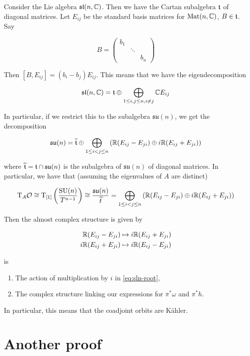 \documentclass{article}
\DeclareMathOperator{\SU}{SU}
\newcommand{\su}{\mathfrak{su}}
\renewcommand{\sl}{\mathfrak{sl}}
\renewcommand{\tilde}{\widetilde}
\begin{document}
Consider the Lie algebra \(\sl(n, \C)\). Then we have the Cartan subalgebra \(\mathfrak{t}\) of diagonal matrices. Let \(E_{ij}\) be the standard basis matrices for \(\operatorname{Mat}(n, \mathbb{C})\), \(B \in \mathfrak{t}\). Say

\[B = \begin{pmatrix}
    b_1 \\
    & \ddots \\
    & & b_n
\end{pmatrix}\]

Then \([B, E_{ij}] = (b_i - b_j)E_{ij}\). This means that we have the eigendecomposition

\begin{equation}
    \label{eq:sln-root}
    \sl(n, \C) = \mft \oplus \bigoplus_{1 \le i, j \le n, i \ne j} \C E_{ij}
\end{equation}

In particular, if we restrict this to the subalgebra \(\su(n)\), we get the decomposition

\[\su(n) = \tilde\mft \oplus \bigoplus_{1 \le i < j \le n} \left(\R(E_{ij} - E_{ji}) \oplus i\R (E_{ij} + E_{ji})\right)\]

where \(\tilde \mft = \mft \cap \su(n)\) is the subalgebra of \(\su(n)\) of diagonal matrices. In particular, we have that (assuming the eigenvalues of \(A\) are distinct)

\[\T_A\mcO \cong \T_{[1]}\left(\frac{\SU(n)}{T^{n-1}}\right) \cong \frac{\su(n)}{\tilde t} = \bigoplus_{1 \le i < j \le n} \left(\R(E_{ij} - E_{ji}) \oplus i\R (E_{ij} + E_{ji})\right)\]

Then the almost complex structure is given by

\begin{align*}
    \mathbb{R}(E_{ij} - E_{ji}) &\mapsto i\mathbb{R}(E_{ij} + E_{ji}) \\
    i\mathbb{R}(E_{ij} + E_{ji}) &\mapsto i\mathbb{R}(E_{ij} - E_{ji})
\end{align*}

is

\begin{enumerate}
    \item The action of multiplication by \(i\) in \cref{eq:sln-root},
    \item The complex structure linking our expressions for \(\pi^*\omega\) and \(\pi^*h\).
\end{enumerate}

In particular, this means that the coadjoint orbits are K\"ahler.

\section{Another proof}
\end{document}
